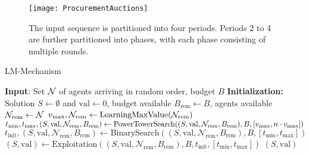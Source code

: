 \def\Brem{B_{\text{rem}}}
\def\Nrem{\mathcal{N}_{\text{rem}}}
\def\tinit{t_{\text{init}}}
\def\tmin{t_{\min}}
\def\tmax{t_{\max}}
\def\val{\text{val}}
\def\Event{\mathcal{E}}
\def\Bin{\mathcal{B}}


\begin{figure}[t]
\centering\texttt{[image: ProcurementAuctions]}
    \caption{The input sequence is partitioned into four periods. Periods 2 to 4 are further partitioned into phases, with each phase consisting of multiple rounds.}
    \label{fig:phases}
\end{figure}


\begin{algorithm}[t]
\caption{LM-Mechanism}\label{alg:LMMECH}
\begin{algorithmic}[1]
\STATE \textbf{Input}: Set $\mathcal{N}$ of agents arriving in random order, budget $B$
\STATE \textbf{Initialization:} Solution $S \gets \emptyset$ and $\val \gets 0$, budget available $\Brem \gets B$, agents available $\Nrem \gets \N$
\STATE $\vmax, \Nrem \gets \text{LearningMaxValue}(\Nrem)$
\STATE $\tmin, \tmax, (S, \val, \Nrem, \Brem) \gets \text{PowerTowerSearch}((S, \val, \Nrem, \Brem), B, [\vmax, n\cdot\vmax])$
\STATE $\tinit, (S, \val, \Nrem, \Brem) \gets \text{BinarySearch}((S, \val, \Nrem, \Brem), B, [\tmin, \tmax])$
\STATE $(S, \val) \gets \text{Exploitation}((S, \val, \Nrem, \Brem), B, \tinit, [\tmin, \tmax])$
\RETURN $(S, \val)$
\end{algorithmic}
\end{algorithm}





